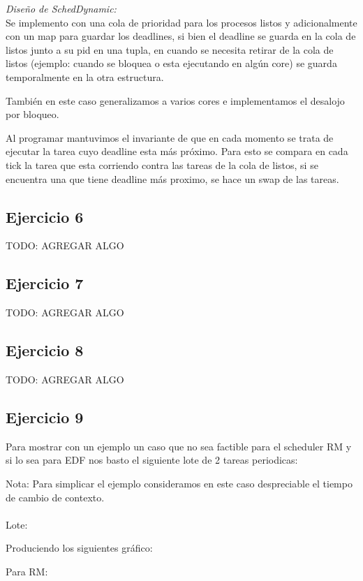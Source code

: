 \noindent
\emph{Diseño de SchedDynamic:} \\

Se implemento con una cola de prioridad para los procesos listos y adicionalmente con un map para guardar los deadlines, si bien el deadline se guarda en la cola de listos junto a su pid en una tupla, en cuando se necesita retirar de la cola de listos (ejemplo: cuando se bloquea o esta ejecutando en algún core) se guarda temporalmente en la otra estructura.

También en este caso generalizamos a varios cores e implementamos el desalojo por bloqueo.

Al programar mantuvimos el invariante de que en cada momento se trata de ejecutar la tarea cuyo deadline esta más próximo. Para esto se compara en cada tick la tarea que esta corriendo contra las tareas de la cola de listos, si se encuentra una que tiene deadline más proximo, se hace un swap de las tareas.\\


\subsection{Ejercicio 6}
TODO: AGREGAR ALGO

\subsection{Ejercicio 7}
TODO: AGREGAR ALGO

\subsection{Ejercicio 8}
TODO: AGREGAR ALGO

\subsection{Ejercicio 9}

Para mostrar con un ejemplo un caso que no sea factible para el scheduler RM y si lo sea para EDF nos basto el siguiente lote de 2 tareas periodicas:

Nota: Para simplicar el ejemplo consideramos en este caso despreciable el tiempo de cambio de contexto.
\\
\\
Lote:


Produciendo los siguientes gráfico:

Para RM:

